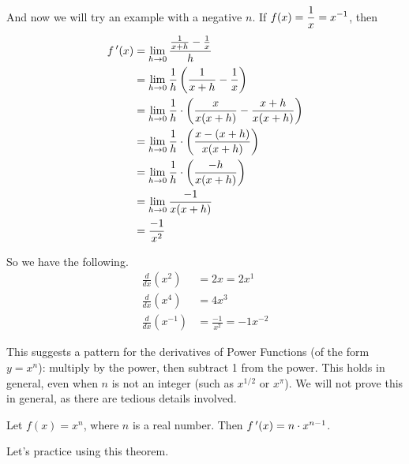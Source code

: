 And now we will try an example with a negative $n$.  If $\displaystyle f(x)=\frac{1}{x} = x^{-1}$, then
\begin{align*}
		f\,'(x) 	&= \lim_{h\to 0} \frac{\frac{1}{x+h}-\frac{1}{x}}{h}\\
&=	\lim_{h\to 0} \frac{1}{h}\left(\frac{1}{x+h}-\frac{1}{x}\right)\\						
&= \lim_{h\to 0} \frac{1}{h}\cdot\left(\frac{x}{x(x+h)} - \frac{x+h}{x(x+h)}\right)\\
						&=	\lim_{h\to 0} \frac 1h\cdot\left(\frac{x-(x+h)}{x(x+h)}\right)\\
						&=	\lim_{h\to 0} \frac1h\cdot\left(\frac{-h}{x(x+h)}\right)\\
						&=	\lim_{h\to 0} \frac{-1}{x(x+h)} \\
						&= \frac{-1}{x^2}
	\end{align*}

So we have the following.
\begin{align*}
\frac{d}{dx}\left(x^2\right) &= 2x = 2x^1\\
\frac{d}{dx}\left(x^4\right) &= 4x^3\\
\frac{d}{dx}\left(x^{-1}\right) &= \frac{-1}{x^2} = -1x^{-2}
\end{align*}

This suggests a pattern for the derivatives of Power Functions (of the form $y=x^n$): multiply by the power, then subtract 1 from the power.  This holds in general, even when $n$ is not an integer (such as $x^{1/2}$ or $x^\pi$).  We will not prove this in general, as there are tedious details involved.

{Let $f(x) = x^n$, where $n$ is a real number. Then $f\,'(x) = n\cdot x^{n-1}$.
}

\enlargethispage{1\baselineskip}
Let's practice using this theorem.\\

